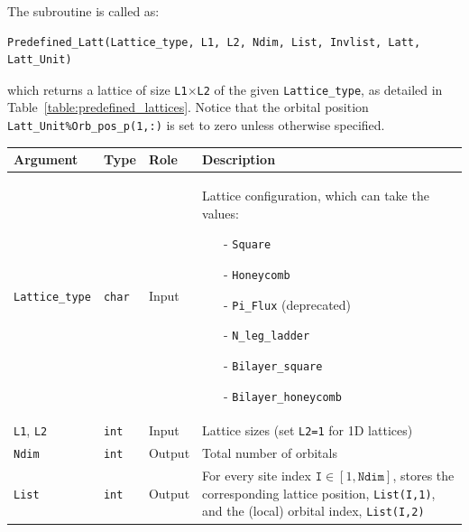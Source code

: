 The subroutine is called as:
\begin{lstlisting}[style=fortran]
Predefined_Latt(Lattice_type, L1, L2, Ndim, List, Invlist, Latt, Latt_Unit)
\end{lstlisting}
which returns a lattice of size \texttt{L1$\times$L2} of the given \texttt{Lattice\_type}, as detailed in Table~\ref{table:predefined_lattices}. Notice that the orbital position \texttt{Latt\_Unit\%Orb\_pos\_p(1,:)} is set to zero unless otherwise specified.
%
\begin{table}[h!]
	\begin{center}
	\begin{tabular}{@{} p{}  p{} p{} p{}  @{}}
		\toprule
		Argument                 & Type                & Role   & Description \\
		\midrule
		\texttt{Lattice\_type}   & \texttt{char}       & Input  & Lattice configuration, which can take the values:
		\vspace{-2\topsep} %
		\begin{itemize}
			\setlength{\itemsep}{0pt} \setlength{\parskip}{0pt} \setlength{\parsep}{0pt}
			\vspace{-0.5\topsep} 
			\item[-] \texttt{Square}
			\item[-] \texttt{Honeycomb}
			\item[-] \texttt{Pi\_Flux}  (deprecated)
			\item[-] \texttt{N\_leg\_ladder}
			\item[-] \texttt{Bilayer\_square}
			\item[-] \texttt{Bilayer\_honeycomb}
			\vspace{-1.2\topsep} 
		\end{itemize} \\
		\texttt{L1}, \texttt{L2} & \texttt{int}        & Input  & Lattice sizes (set \texttt{L2=1} for 1D lattices)\\
		\texttt{Ndim}            & \texttt{int}        & Output & Total number of orbitals\\
		\texttt{List}            & \texttt{int}        & Output & For every site index $\texttt{I} \in [1,\texttt{Ndim}]$, stores the corresponding lattice position, \texttt{List(I,1)}, and the (local) orbital index, \texttt{List(I,2)}\\

\end{tabular}
\end{center}
\end{table}
